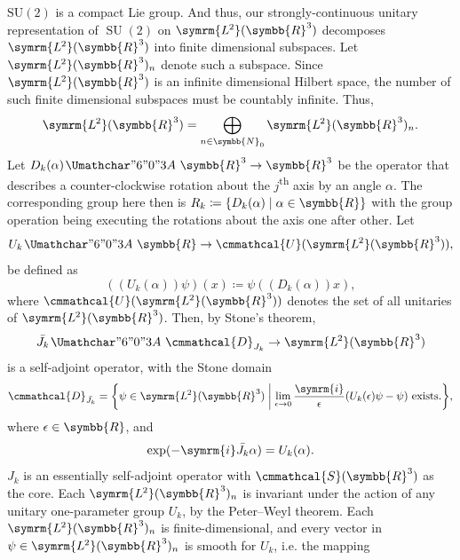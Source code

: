 \documentclass[12pt, a4 paper]{article}
\renewcommand{\symcal}{\cmmathcal}
\theoremstyle{definition}
\newcommand{\ltwo}{\symrm{L\kern-0.3pt^2}}
\newcommand{\ltworthree}{\ltwo(\rr^3)}
\newcommand{\rthree}{\symbb{R}^3}
\newcommand{\rr}{\symbb{R}}
\newcommand{\nn}{\symbb{N}_0}
\newcommand{\schwartz}{\symcal{S}}
\newcommand{\schwartzrthree}{\schwartz(\rr^3)}
\renewcommand{\i}{\symrm{i}}
\newcommand{\domain}{\symcal{D}}
\newcommand{\spec}{\sigma}
\newcommand{\SUtwo}{\operatorname{SU}(2)}
\newcommand\restr[2]{{%
        \left.\kern-\nulldelimiterspace %
        #1 %
        \littletaller %
        \right|_{#2} %
    }}
\newcommand{\littletaller}{\mathchoice{\vphantom{\big|}}{}{}{}}
\renewcommand{\colon}{\nobreak\mskip2mu\mathpunct{}\nonscript
  \mkern-\thinmuskip{\Umathchar"6 "0 "3A}\mskip6muplus1mu\relax}
\begin{document}
    \(\operatorname{SU(2)}\) is a compact Lie group. And thus, our strongly-continuous unitary representation of \(\SUtwo\) on \(\ltworthree\) decomposes \(\ltworthree\) into finite dimensional subspaces. Let \(\ltworthree_n\) denote such a subspace. Since \(\ltworthree\) is an infinite dimensional Hilbert space, the number of such finite dimensional subspaces must be countably infinite. Thus,
    \[
        \ltworthree = \bigoplus_{n \in \nn} \ltworthree_n.
    \]
    Let \(D_k(\alpha) \colon \rthree \rightarrow \rthree\) be the operator that describes a counter-clockwise rotation about the \(j\)\textsuperscript{th} axis by an angle \(\alpha\). The corresponding group here then is \(R_k \coloneq \{D_k(\alpha) \mid \alpha \in \rr\}\) with the group operation being executing the rotations about the axis one after other. Let
    \[
        U_k \colon \rr \rightarrow \symcal{U}(\ltworthree),
    \]
    be defined as
    \[
        ((U_k(\alpha))\psi)(x) \coloneq \psi((D_k(\alpha))x), 
    \]
    where \(\symcal{U}(\ltworthree)\) denotes the set of all unitaries of \(\ltworthree\). Then, by Stone's theorem,
    \[
        \bar{J_k} \colon \domain_{J_k} \rightarrow \ltworthree
    \] 
    is a self-adjoint operator, with the Stone domain
    \[
        \domain_{\bar{J_k}} = \bigg\{ \psi \in \ltworthree \biggm| \lim_{\epsilon \rightarrow 0} \frac{\i}{\epsilon} (U_k(\epsilon)\psi - \psi) \text{ exists.}\bigg\},
    \]
    where \(\epsilon \in \rr\), and
    \[
        \exp(-\i \bar{J_k} \alpha) = U_k(\alpha).
    \]
    \(J_k\) is an essentially self-adjoint operator with \(\schwartzrthree\) as the core. Each \(\ltworthree_n\) is invariant under the action of any unitary one-parameter group \(U_k\), by the Peter--Weyl theorem. Each \(\ltworthree_n\) is finite-dimensional, and every vector in \(\psi \in \ltworthree_n\) is smooth for \(U_k\), i.e. the mapping
\end{document}
